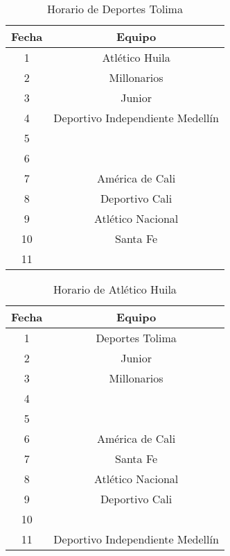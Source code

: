 \documentclass[11pt]{article}
\begin{document}
\begin{multicols}{2}
            \begin{table}[H]
                \centering
                \begin{tabular}{|c||c|}
                    \hline
                    Fecha & Equipo\\ \hline
                    1 & Atlético Huila\\ \hline
                    2 & Millonarios \\ \hline
                    3 & Junior \\ \hline
                    4 & Deportivo Independiente Medellín \\ \hline
                    5 &  \\ \hline
                    6 &  \\ \hline
                    7 & América de Cali \\ \hline
                    8 & Deportivo Cali\\ \hline
                    9 & Atlético Nacional \\ \hline
                    10 & Santa Fe \\ \hline
                    11 &  \\ \hline
                \end{tabular} 
                \caption{Horario de Deportes Tolima }
            \end{table}

            \begin{table}[H]
                \centering
                \begin{tabular}{|c||c|}
                    \hline
                    Fecha & Equipo\\ \hline
                    1 & Deportes Tolima \\ \hline
                    2 & Junior \\ \hline
                    3 & Millonarios \\ \hline
                    4 &  \\ \hline
                    5 &  \\ \hline
                    6 & América de Cali \\ \hline
                    7 & Santa Fe \\ \hline
                    8 & Atlético Nacional\\ \hline
                    9 & Deportivo Cali \\ \hline
                    10 &  \\ \hline
                    11 & Deportivo Independiente Medellín \\ \hline
                \end{tabular} 
                \caption{Horario de Atlético Huila}
            \end{table}


\end{multicols}
\end{document}
